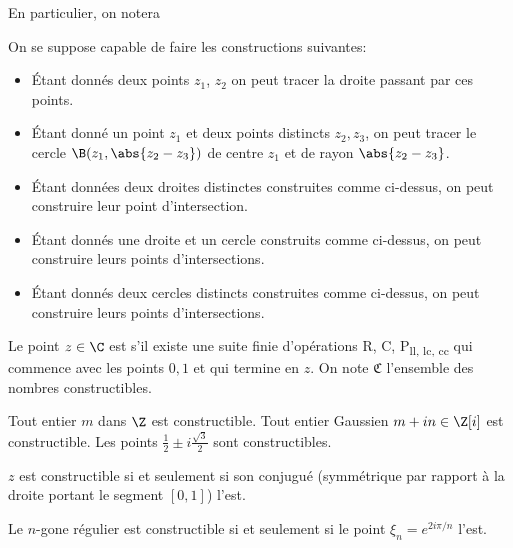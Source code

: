 \documentclass[math, info]{mpb-cours}
\def\fC{\mathfrak{C}}
\begin{document}
En particulier, on notera

\begin{definition}[Axiomatique]
	On se suppose capable de faire les constructions suivantes:
	\begin{itemize}
		\item[R] Étant donnés deux points $z_{1}$, $z_{2}$ on peut tracer la droite passant par ces points.
		\item[C] Étant donné un point $z_{1}$ et deux points distincts $z_{2}, z_{3}$, on peut tracer le cercle
		      $\B(z_{1}, \abs{z_{2} - z_{3}})$ de centre $z_{1}$ et de rayon $\abs{z_{2} - z_{3}}$.
		\item[P\textsubscript{ll}] Étant données deux droites distinctes construites comme ci-dessus, on peut
		      construire leur point d'intersection.
		\item[P\textsubscript{lc}] Étant donnés une droite et un cercle construits comme ci-dessus, on peut
		      construire leurs points d'intersections.
		\item[P\textsubscript{cc}] Étant donnés deux cercles distincts construites comme ci-dessus, on peut
		      construire leurs points d'intersections.
	\end{itemize}
\end{definition}

\begin{definition}
	Le point $z \in \C$ est  s'il existe une suite finie d'opérations R, C,
	P\textsubscript{ll, lc, cc} qui commence avec les points $0, 1$ et qui termine en $z$.
	On note $\fC$ l'ensemble des nombres constructibles.
\end{definition}

\begin{exemple}
	Tout entier $m$ dans $\Z$ est constructible. Tout entier Gaussien $m + in \in \Z[i]$ est constructible.
	Les points $\frac{1}{2} \pm i \frac{\sqrt{3}}{2}$ sont constructibles.
\end{exemple}

\begin{proposition}
	$z$ est constructible si et seulement si son conjugué (symmétrique par rapport à la droite portant le
	segment $[0, 1]$) l'est.
\end{proposition}

\begin{thm}
	Le $n$-gone régulier est constructible si et seulement si le point $\xi_{n} = e^{2i\pi/n}$ l'est.
\end{thm}
\end{document}
